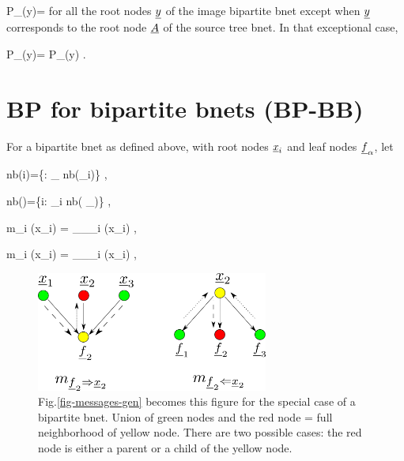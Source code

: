 \beq\color{blue}
P_\rvy(y)= 
\;
\eeq
for all the root nodes 
${\underline{y}}$ of the
image bipartite bnet
except when
${\underline{y}}$ corresponds to
the root node ${\underline{A}}$
of the source tree bnet.
In that exceptional case,

\beq\color{blue}
P_\rvy(y)= P_\rvA(y)
\;.
\eeq


\section{BP for
bipartite bnets (BP-BB)}
For
a bipartite
bnet as defined above,
with
root nodes ${\underline{x}}_i$
and leaf nodes ${\underline{f}}_\alpha$,
let


\beq
nb(i)=\{\alp: \rvf_\alpha\in
nb(\rvx_i)\}
\;,
\eeq

\beq
nb(\alpha)=\{i: \rvx_i\in
nb( \rvf_\alpha)\}
\;,
\eeq

\beq
m_{\alp\ldart i}
(x_i)
=
\pi_{\rvf_\alpha \ldart\rvx_i }
(x_i)
\;,
\eeq

\beq
m_{\alp\rdart i}
(x_i)
=
\lam_{\rvf_\alp\rdart \rvx_i}
(x_i)
\;,
\eeq


\begin{figure}[h!]
\centering
\includegraphics[width=3in]
{mpass/mpass-messages-bip.png}
\caption{
Fig.\ref{fig-messages-gen}
becomes this figure
for the special case of a
bipartite bnet. Union of green nodes and the red node = full
 neighborhood of yellow node.
There are two possible
cases:  the
red node is either a parent
or a child  of the yellow
node.}
\label{fig-messages-bip}
\end{figure}

